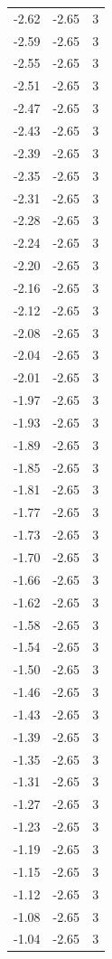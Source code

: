 \begin{longtable}{lrr}
  -2.62 & -2.65 & 3 \\
  -2.59 & -2.65 & 3 \\
  -2.55 & -2.65 & 3 \\
  -2.51 & -2.65 & 3 \\
  -2.47 & -2.65 & 3 \\
  -2.43 & -2.65 & 3 \\
  -2.39 & -2.65 & 3 \\
  -2.35 & -2.65 & 3 \\
  -2.31 & -2.65 & 3 \\
  -2.28 & -2.65 & 3 \\
  -2.24 & -2.65 & 3 \\
  -2.20 & -2.65 & 3 \\
  -2.16 & -2.65 & 3 \\
  -2.12 & -2.65 & 3 \\
  -2.08 & -2.65 & 3 \\
  -2.04 & -2.65 & 3 \\
  -2.01 & -2.65 & 3 \\
  -1.97 & -2.65 & 3 \\
  -1.93 & -2.65 & 3 \\
  -1.89 & -2.65 & 3 \\
  -1.85 & -2.65 & 3 \\
  -1.81 & -2.65 & 3 \\
  -1.77 & -2.65 & 3 \\
  -1.73 & -2.65 & 3 \\
  -1.70 & -2.65 & 3 \\
  -1.66 & -2.65 & 3 \\
  -1.62 & -2.65 & 3 \\
  -1.58 & -2.65 & 3 \\
  -1.54 & -2.65 & 3 \\
  -1.50 & -2.65 & 3 \\
  -1.46 & -2.65 & 3 \\
  -1.43 & -2.65 & 3 \\
  -1.39 & -2.65 & 3 \\
  -1.35 & -2.65 & 3 \\
  -1.31 & -2.65 & 3 \\
  -1.27 & -2.65 & 3 \\
  -1.23 & -2.65 & 3 \\
  -1.19 & -2.65 & 3 \\
  -1.15 & -2.65 & 3 \\
  -1.12 & -2.65 & 3 \\
  -1.08 & -2.65 & 3 \\
  -1.04 & -2.65 & 3 \\

\end{longtable}
